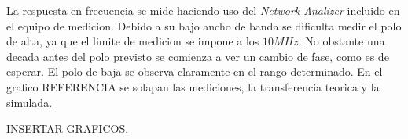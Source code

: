 La respuesta en frecuencia se mide haciendo uso del \textit{Network Analizer} incluido en el equipo de medicion. Debido a su bajo ancho de banda se dificulta medir el polo de alta, ya que el limite de medicion se impone a los $10 MHz$. No obstante una decada antes del polo previsto se comienza a ver un cambio de fase, como es de esperar.
El polo de baja se observa claramente en el rango determinado. En el grafico REFERENCIA se solapan las mediciones, la transferencia teorica y la simulada.

INSERTAR GRAFICOS.



